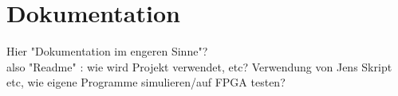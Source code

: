 \chapter{Dokumentation} %
\label{Dokumentation} %

Hier "Dokumentation im engeren Sinne"? \\
also "Readme" : wie wird Projekt verwendet, etc? Verwendung von Jens Skript etc, wie eigene Programme simulieren/auf FPGA testen?
